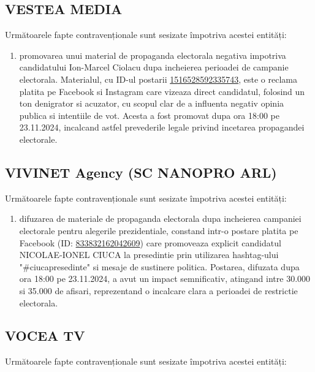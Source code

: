 \documentclass[a4paper,12pt]{article}
\begin{document}
\vspace{0.5cm}

\subsection{VESTEA MEDIA}
Următoarele fapte contravenționale sunt sesizate împotriva acestei entități:

\begin{enumerate}[leftmargin=*, label=\arabic*.)]
    \item promovarea unui material de propaganda electorala negativa impotriva candidatului Ion-Marcel Ciolacu dupa incheierea perioadei de campanie electorala. Materialul, cu ID-ul postarii \href{https://www.facebook.com/ads/library/?id=1516528592335743}{1516528592335743}, este o reclama platita pe Facebook si Instagram care vizeaza direct candidatul, folosind un ton denigrator si acuzator, cu scopul clar de a influenta negativ opinia publica si intentiile de vot. Acesta a fost promovat dupa ora 18:00 pe 23.11.2024, incalcand astfel prevederile legale privind incetarea propagandei electorale.
\end{enumerate}

\vspace{0.5cm}

\subsection{VIVINET Agency (SC NANOPRO ARL)}
Următoarele fapte contravenționale sunt sesizate împotriva acestei entități:

\begin{enumerate}[leftmargin=*, label=\arabic*.)]
    \item difuzarea de materiale de propaganda electorala dupa incheierea campaniei electorale pentru alegerile prezidentiale, constand intr-o postare platita pe Facebook (ID: \href{https://www.facebook.com/ads/library/?id=833832162042609}{833832162042609}) care promoveaza explicit candidatul NICOLAE-IONEL CIUCA la presedintie prin utilizarea hashtag-ului "\#ciucapresedinte" si mesaje de sustinere politica. Postarea, difuzata dupa ora 18:00 pe 23.11.2024, a avut un impact semnificativ, atingand intre 30.000 si 35.000 de afisari, reprezentand o incalcare clara a perioadei de restrictie electorala.
\end{enumerate}

\vspace{0.5cm}

\subsection{VOCEA TV}
Următoarele fapte contravenționale sunt sesizate împotriva acestei entități:
\end{document}
